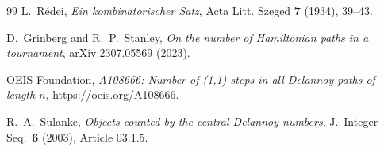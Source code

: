 \documentclass[11pt]{amsart}
\theoremstyle{definition}
\begin{document}
\begin{thebibliography}{99}
 L.~R\'edei, \emph{Ein kombinatorischer Satz}, Acta Litt. Szeged \textbf{7} (1934), 39--43.

 D.~Grinberg and R.~P.~Stanley, \emph{On the number of Hamiltonian paths in a tournament}, arXiv:2307.05569 (2023).

 OEIS Foundation, \emph{A108666: Number of (1,1)-steps in all Delannoy paths of length $n$}, \url{https://oeis.org/A108666}.

 R.~A.~Sulanke, \emph{Objects counted by the central Delannoy numbers}, J.\ Integer Seq.\ \textbf{6} (2003), Article 03.1.5.
\end{thebibliography}
\end{document}
